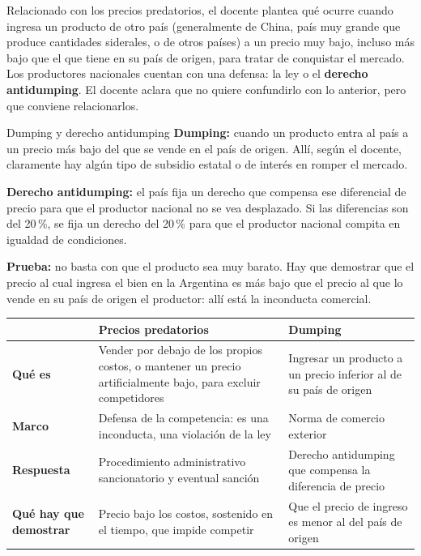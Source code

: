 \documentclass[12pt,oneside]{book}
\begin{document}
Relacionado con los precios predatorios, el docente plantea qué ocurre cuando ingresa un producto de otro país (generalmente de China, país muy grande que produce cantidades siderales, o de otros países) a un precio muy bajo, incluso más bajo que el que tiene en su país de origen, para tratar de conquistar el mercado. Los productores nacionales cuentan con una defensa: la ley o el \textbf{derecho antidumping}. El docente aclara que no quiere confundirlo con lo anterior, pero que conviene relacionarlos.

\begin{definition}{Dumping y derecho antidumping}
\textbf{Dumping:} cuando un producto entra al país a un precio más bajo del que se vende en el país de origen. Allí, según el docente, claramente hay algún tipo de subsidio estatal o de interés en romper el mercado.

\textbf{Derecho antidumping:} el país fija un derecho que compensa ese diferencial de precio para que el productor nacional no se vea desplazado. Si las diferencias son del 20\,\%, se fija un derecho del 20\,\% para que el productor nacional compita en igualdad de condiciones.

\textbf{Prueba:} no basta con que el producto sea muy barato. Hay que demostrar que el precio al cual ingresa el bien en la Argentina es más bajo que el precio al que lo vende en su país de origen el productor: allí está la inconducta comercial.
\end{definition}

\begin{table}[H]
\centering
\renewcommand{\arraystretch}{1.25}
\begin{tabularx}{\textwidth}{
    >{\raggedright\arraybackslash}p{}
    >{\raggedright\arraybackslash}X
    >{\raggedright\arraybackslash}X
}
\toprule
 & \textbf{Precios predatorios} & \textbf{Dumping} \\
\midrule
\textbf{Qué es} & Vender por debajo de los propios costos, o mantener un precio artificialmente bajo, para excluir competidores & Ingresar un producto a un precio inferior al de su país de origen \\
\textbf{Marco} & Defensa de la competencia: es una inconducta, una violación de la ley & Norma de comercio exterior \\
\textbf{Respuesta} & Procedimiento administrativo sancionatorio y eventual sanción & Derecho antidumping que compensa la diferencia de precio \\
\textbf{Qué hay que demostrar} & Precio bajo los costos, sostenido en el tiempo, que impide competir & Que el precio de ingreso es menor al del país de origen \\
\bottomrule
\end{tabularx}
\end{table}
\end{document}

